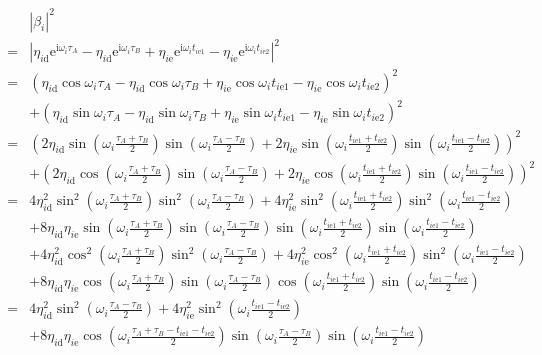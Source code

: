 \documentclass[10pt,fleqn]{article}
\newcommand{\ue}{\mathrm{e}}
\newcommand{\ui}{\mathrm{i}}
\newcommand{\eqar}[1]
{
  \begin{align}
    #1
  \end{align}
}
\newcommand{\paren}[1]{{\left({#1}\right)}}
\newcommand{\abs}[1]{{\left|{#1}\right|}}
\begin{document}
\eqar{
  \begin{split}
    &\abs{\beta_i}^2\\
    =&\abs{\eta_{i\mathrm{d}}\ue^{\ui\omega_i\tau_A}-\eta_{i\mathrm{d}}\ue^{\ui\omega_i\tau_B}+\eta_{i\mathrm{e}}\ue^{\ui\omega_it_{i\mathrm{e}1}}-\eta_{i\mathrm{e}}\ue^{\ui\omega_it_{i\mathrm{e}2}}}^2\\
    =&\paren{\eta_{i\mathrm{d}}\cos\omega_i\tau_A-\eta_{i\mathrm{d}}\cos\omega_i\tau_B+\eta_{i\mathrm{e}}\cos\omega_it_{i\mathrm{e}1}-\eta_{i\mathrm{e}}\cos\omega_it_{i\mathrm{e}2}}^2\\
    &+\paren{\eta_{i\mathrm{d}}\sin\omega_i\tau_A-\eta_{i\mathrm{d}}\sin\omega_i\tau_B+\eta_{i\mathrm{e}}\sin\omega_it_{i\mathrm{e}1}-\eta_{i\mathrm{e}}\sin\omega_it_{i\mathrm{e}2}}^2\\
    =&\paren{
       2\eta_{i\mathrm{d}}\sin\paren{\omega_i\frac{\tau_A+\tau_B}{2}}
       \sin\paren{\omega_i\frac{\tau_A-\tau_B}{2}}
       +2\eta_{i\mathrm{e}}\sin\paren{\omega_i\frac{t_{i\mathrm{e}1}+t_{i\mathrm{e}2}}{2}}
       \sin\paren{\omega_i\frac{t_{i\mathrm{e}1}-t_{i\mathrm{e}2}}{2}}
       }^2\\
    &+\paren{
      2\eta_{i\mathrm{d}}\cos\paren{\omega_i\frac{\tau_A+\tau_B}{2}}
      \sin\paren{\omega_i\frac{\tau_A-\tau_B}{2}}
      +2\eta_{i\mathrm{e}}\cos\paren{\omega_i\frac{t_{i\mathrm{e}1}+t_{i\mathrm{e}2}}{2}}
      \sin\paren{\omega_i\frac{t_{i\mathrm{e}1}-t_{i\mathrm{e}2}}{2}}
      }^2
    \\
    =&4\eta_{i\mathrm{d}}^2\sin^2\paren{\omega_i\frac{\tau_A+\tau_B}{2}}
       \sin^2\paren{\omega_i\frac{\tau_A-\tau_B}{2}}
       +4\eta_{i\mathrm{e}}^2\sin^2\paren{\omega_i\frac{t_{i\mathrm{e}1}+t_{i\mathrm{e}2}}{2}}
       \sin^2\paren{\omega_i\frac{t_{i\mathrm{e}1}-t_{i\mathrm{e}2}}{2}}\\
    &+8\eta_{i\mathrm{d}}\eta_{i\mathrm{e}}\sin\paren{\omega_i\frac{\tau_A+\tau_B}{2}}
      \sin\paren{\omega_i\frac{\tau_A-\tau_B}{2}}
      \sin\paren{\omega_i\frac{t_{i\mathrm{e}1}+t_{i\mathrm{e}2}}{2}}
      \sin\paren{\omega_i\frac{t_{i\mathrm{e}1}-t_{i\mathrm{e}2}}{2}}\\
    &+4\eta_{i\mathrm{d}}^2\cos^2\paren{\omega_i\frac{\tau_A+\tau_B}{2}}
      \sin^2\paren{\omega_i\frac{\tau_A-\tau_B}{2}}
      +4\eta_{i\mathrm{e}}^2\cos^2\paren{\omega_i\frac{t_{i\mathrm{e}1}+t_{i\mathrm{e}2}}{2}}
      \sin^2\paren{\omega_i\frac{t_{i\mathrm{e}1}-t_{i\mathrm{e}2}}{2}}\\
    &+8\eta_{i\mathrm{d}}\eta_{i\mathrm{e}}\cos\paren{\omega_i\frac{\tau_A+\tau_B}{2}}
      \sin\paren{\omega_i\frac{\tau_A-\tau_B}{2}}
      \cos\paren{\omega_i\frac{t_{i\mathrm{e}1}+t_{i\mathrm{e}2}}{2}}
      \sin\paren{\omega_i\frac{t_{i\mathrm{e}1}-t_{i\mathrm{e}2}}{2}}
    \\
    =&4\eta_{i\mathrm{d}}^2\sin^2\paren{\omega_i\frac{\tau_A-\tau_B}{2}}
       +4\eta_{i\mathrm{e}}^2\sin^2\paren{\omega_i\frac{t_{i\mathrm{e}1}-t_{i\mathrm{e}2}}{2}}\\
    &+8\eta_{i\mathrm{d}}\eta_{i\mathrm{e}}\cos\paren{\omega_i\frac{\tau_A+\tau_B-t_{i\mathrm{e}1}-t_{i\mathrm{e}2}}{2}}
      \sin\paren{\omega_i\frac{\tau_A-\tau_B}{2}}
      \sin\paren{\omega_i\frac{t_{i\mathrm{e}1}-t_{i\mathrm{e}2}}{2}}
  \end{split}
}
\end{document}
